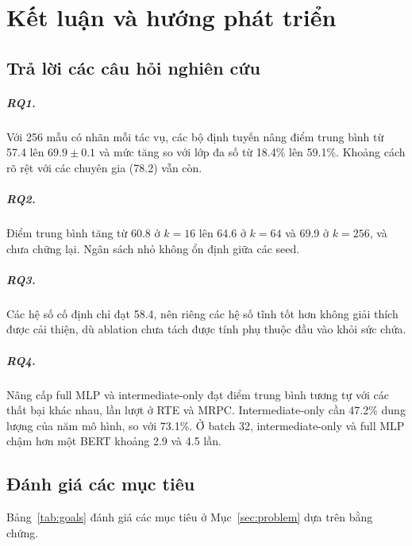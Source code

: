 \chapter{Kết luận và hướng phát triển}
\label{ch:conclusion}

\section{Trả lời các câu hỏi nghiên cứu}

\paragraph{RQ1.} Với 256 mẫu có nhãn mỗi tác vụ, các bộ định tuyến nâng điểm trung bình từ 57.4 lên $69.9\pm0.1$ và mức tăng so với lớp đa số từ 18.4\% lên 59.1\%. Khoảng cách rõ rệt với các chuyên gia (78.2) vẫn còn.

\paragraph{RQ2.} Điểm trung bình tăng từ 60.8 ở $k=16$ lên 64.6 ở $k=64$ và 69.9 ở $k=256$, và chưa chững lại. Ngân sách nhỏ không ổn định giữa các seed.

\paragraph{RQ3.} Các hệ số cố định chỉ đạt 58.4, nên riêng các hệ số tĩnh tốt hơn không giải thích được cải thiện, dù ablation chưa tách được tính phụ thuộc đầu vào khỏi sức chứa.

\paragraph{RQ4.} Nâng cấp full MLP và intermediate-only đạt điểm trung bình tương tự với các thất bại khác nhau, lần lượt ở RTE và MRPC. Intermediate-only cần 47.2\% dung lượng của năm mô hình, so với 73.1\%. Ở batch 32, intermediate-only và full MLP chậm hơn một BERT khoảng 2.9 và 4.5 lần.

\section{Đánh giá các mục tiêu}

Bảng~\ref{tab:goals} đánh giá các mục tiêu ở Mục~\ref{sec:problem} dựa trên bằng chứng.

